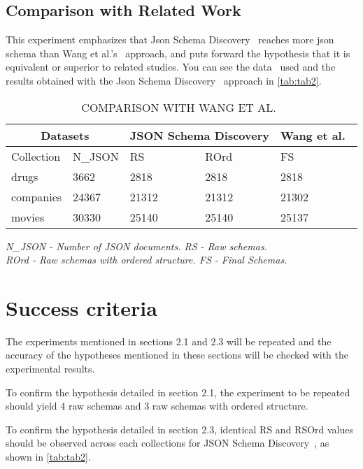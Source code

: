 \documentclass[sigconf, nonacm]{acmart}
\begin{document}
\subsection{Comparison with Related Work}
This experiment emphasizes that Json Schema Discovery~\cite{JSONSchemaDiscovery} reaches more json schema than Wang et al.'s~\cite{Wang2015SchemaManagement} approach, and puts forward the hypothesis that it is equivalent or superior to related studies. You can see the data~\cite{datasets} used and the results obtained with the Json Schema Discovery~\cite{JSONSchemaDiscovery} approach in \autoref{tab:tab2}.

\begin{table}[htbp]
  \centering
  \caption{COMPARISON WITH WANG ET AL.~\cite{Wang2015SchemaManagement} }
  \label{tab:tab2}
  \begin{tabular}{|l|l|l|l|l|}
    \hline
    \multicolumn{2}{|c|}{\small Datasets} & \multicolumn{2}{c|}{\small JSON Schema Discovery} & \multicolumn{1}{c|}{ \small Wang et al.~\cite{Wang2015SchemaManagement}} \\ \hline
    Collection & N\_JSON & RS & ROrd & FS \\ \hline
    drugs & 3662 & 2818 & 2818 & 2818 \\ \hline
    companies & 24367 & 21312 & 21312 & 21302 \\ \hline
    movies & 30330 & 25140 & 25140 & 25137 \\ \hline
  \end{tabular}
    \smallskip %
  \textit{N\_JSON - Number of JSON documents. RS - Raw schemas. \\
  ROrd - Raw schemas with ordered structure. FS - Final Schemas.}
\end{table}

\section{Success criteria}
The experiments mentioned in sections 2.1 and 2.3 will be repeated and the accuracy of the hypotheses mentioned in these sections will be checked with the experimental results.

To confirm the hypothesis detailed in section 2.1, the experiment to be repeated should yield 4 raw schemas and 3 raw schemas with ordered structure.

To confirm  the hypothesis detailed in section 2.3, identical RS and RSOrd values should be observed across each collections for JSON Schema Discovery~\cite{JSONSchemaDiscovery}, as shown in \autoref{tab:tab2}.
\end{document}
